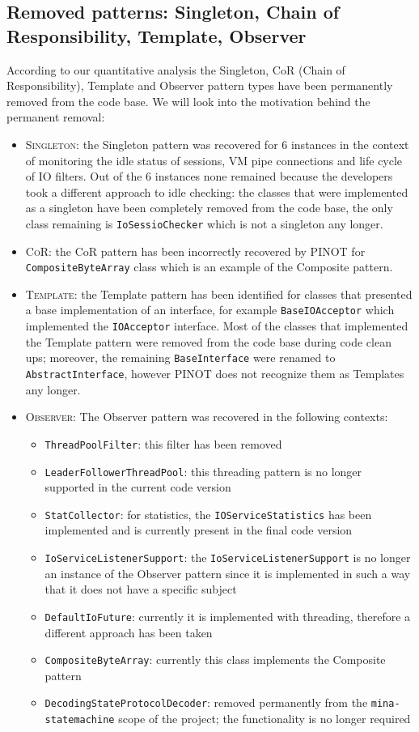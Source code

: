 \subsection{Removed patterns: Singleton, Chain of Responsibility, Template, Observer}
According to our quantitative analysis the Singleton, CoR (Chain of Responsibility), Template and Observer pattern types have been permanently removed from the code base. We will look into the motivation behind the permanent removal:
\begin{itemize}
    \item \textsc{Singleton}: the Singleton pattern was recovered for 6 instances in the context of monitoring the idle status of sessions, VM pipe connections and life cycle of IO filters. Out of the 6 instances none remained because the developers took a different approach to idle checking: the classes that were implemented as a singleton have been completely removed from the code base, the only class remaining is \texttt{IoSessioChecker} which is not a singleton any longer.
    \item \textsc{CoR}: the CoR pattern has been incorrectly recovered by PINOT for \texttt{CompositeByteArray} class which is an example of the Composite pattern.
    \item \textsc{Template}: the Template pattern has been identified for classes that presented a base implementation of an interface, for example \texttt{BaseIOAcceptor} which implemented the  \texttt{IOAcceptor} interface. Most of the classes that implemented the Template pattern were removed from the code base during code clean ups; moreover, the remaining \texttt{BaseInterface} were renamed to \texttt{AbstractInterface}, however PINOT does not recognize them as Templates any longer.
    \item \textsc{Observer}: The Observer pattern was recovered in the following contexts:
    \begin{itemize}
        \item \texttt{ThreadPoolFilter}: this filter has been removed
        \item \texttt{LeaderFollowerThreadPool}: this threading pattern is no longer supported in the current code version
        \item \texttt{StatCollector}: for statistics, the \texttt{IOServiceStatistics} has been implemented and is currently present in the final code version
        \item \texttt{IoServiceListenerSupport}: the \texttt{IoServiceListenerSupport} is no longer an instance of the Observer pattern since it is implemented in such a way that it does not have a specific subject
        \item \texttt{DefaultIoFuture}: currently it is implemented with threading, therefore a different approach has been taken
        \item \texttt{CompositeByteArray}: currently this class implements the Composite pattern
        \item \texttt{DecodingStateProtocolDecoder}: removed permanently from the \texttt{mina-statemachine} scope of the project; the functionality is no longer required
    \end{itemize}
    

\end{itemize}
